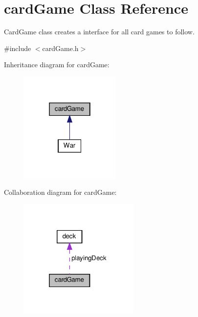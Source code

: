 \hypertarget{classcardGame}{}\section{card\+Game Class Reference}
\label{classcardGame}


Card\+Game class creates a interface for all card games to follow.  




{\ttfamily \#include $<$card\+Game.\+h$>$}



Inheritance diagram for card\+Game\+:\nopagebreak
\begin{figure}[H]
\begin{center}
\leavevmode
\includegraphics[width=142pt]{classcardGame__inherit__graph}
\end{center}
\end{figure}


Collaboration diagram for card\+Game\+:\nopagebreak
\begin{figure}[H]
\begin{center}
\leavevmode
\includegraphics[width=169pt]{classcardGame__coll__graph}
\end{center}
\end{figure}
